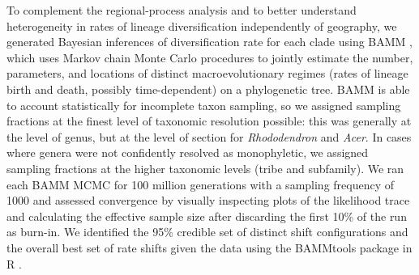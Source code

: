 To complement the regional-process analysis and to better understand heterogeneity in rates of lineage diversification independently of geography, we generated Bayesian inferences of diversification rate for each clade using BAMM \cite{Rabosky2014}, which uses Markov chain Monte Carlo procedures to jointly estimate the number, parameters, and locations of distinct macroevolutionary regimes (rates of lineage birth and death, possibly time-dependent) on a phylogenetic tree. BAMM is able to account statistically for incomplete taxon sampling, so we assigned sampling fractions at the finest level of taxonomic resolution possible: this was generally at the level of genus, but at the level of section for \textit{Rhododendron} and \textit{Acer}. In cases where genera were not confidently resolved as monophyletic, we assigned sampling fractions at the higher taxonomic levels (tribe and subfamily). We ran each BAMM MCMC for 100 million generations with a sampling frequency of 1000 and assessed convergence by visually inspecting plots of the likelihood trace and calculating the effective sample size after discarding the first 10\% of the run as burn-in. We identified the 95\% credible set of distinct shift configurations and the overall best set of rate shifts given the data using the BAMMtools package in R \cite{Rabosky2014}.